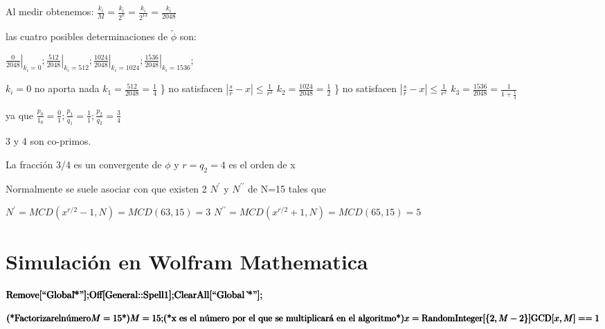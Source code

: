 Al medir obtenemos: $\frac{k_i}{M} = \frac{k_i}{2^k} = \frac{k_i}{2^{13}} = \frac{k_i}{2048}$

las cuatro posibles determinaciones de $\tilde{\phi}$ son:

$\left. \frac{0}{2048} \right|_{k_i=0}; \left. \frac{512}{2048} \right|_{k_i=512}; \left. \frac{1024}{2048} \right|_{k_i=1024}; \left. \frac{1536}{2048} \right|_{k_i=1536};$

$k_i = 0$ no aporta nada
$k_1 = \frac{512}{2048} = \frac{1}{4}$ \} no satisfacen $|\frac{s}{r} - x| \leq \frac{1}{r^2}$
$k_2 = \frac{1024}{2048} = \frac{1}{2}$ \} no satisfacen $|\frac{s}{r} - x| \leq \frac{1}{r^2}$
$k_3 = \frac{1536}{2048} = \frac{1}{1+\frac{1}{3}}$

ya que $\frac{p_0}{1_0} = \frac{0}{1}; \frac{p_1}{q_1} = \frac{1}{1}; \frac{p_2}{q_2} = \frac{3}{4}$

3 y 4 son co-primos.

La fracción 3/4 es un convergente de $\phi$ y $r = q_2 = 4$ es el orden de x

Normalmente se suele asociar con que existen 2 $N^\prime$ y $N^{\prime\prime}$ de N=15 tales que

$N^\prime = MCD(x^{r/2} - 1, N) = MCD(63, 15) = 3$
$N^{\prime\prime} = MCD(x^{r/2} + 1, N) = MCD(65, 15) = 5$

\section{Simulación en Wolfram Mathematica}

\begin{doublespace}
\noindent\(\pmb{\text{Remove}[\text{{``}Global$\grave{ }$*{''}}];}\\
\pmb{\text{Off}[\text{General}\text{::}\text{Spell1}];}\\
\pmb{\text{ClearAll}[\text{{``}Global $\grave{ }$*{''}}];}\)
\end{doublespace}

\begin{doublespace}
\noindent\(\pmb{\text{(*}\text{Factorizar} \text{el} \text{n{\' u}mero} M=15\text{*)}}\\
\pmb{M=15;}\\
\pmb{\text{(*x es el n{\' u}mero por el que se multiplicar{\' a} en el algoritmo*)}}\\
\pmb{x=\text{RandomInteger}[\{2,M-2\}]}\\
\pmb{\text{GCD}[x,M]==1}\)
\end{doublespace}

